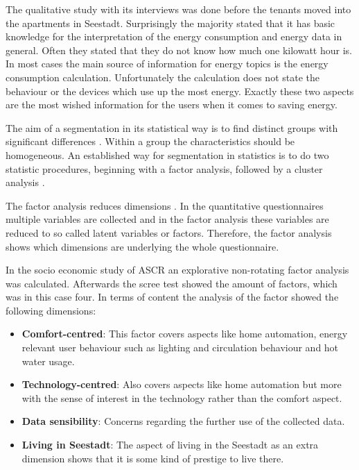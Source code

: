 The qualitative study with its interviews was done before the tenants moved into the apartments in Seestadt. Surprisingly the majority stated that it has basic knowledge for the interpretation of the energy consumption and energy data in general. Often they stated that they do not know how much one kilowatt hour is. In most cases the main source of information for energy topics is the energy consumption calculation. Unfortunately the calculation does not state the behaviour or the devices which use up the most energy. Exactly these two aspects are the most wished information for the users when it comes to saving energy.

The aim of a segmentation in its statistical way is to find distinct groups with significant differences \cite{punj1983cluster}. Within a group the characteristics should be homogeneous. An established way for segmentation in statistics is to do two statistic procedures, beginning with a factor analysis, followed by a cluster analysis \cite{tuffery2011data}.

The factor analysis reduces dimensions \cite{williams2010exploratory}. In the quantitative questionnaires multiple variables are collected and in the factor analysis these variables are reduced to so called latent variables or factors. Therefore, the factor analysis shows which dimensions are underlying the whole questionnaire.

In the socio economic study of ASCR an explorative non-rotating factor analysis was calculated. Afterwards the scree test showed the amount of factors, which was in this case four. In terms of content the analysis of the factor showed the following dimensions:

\begin{itemize}
	\item \textbf{Comfort-centred}: This factor covers aspects like home automation, energy relevant user behaviour such as lighting and circulation behaviour and hot water usage. 
	\item \textbf{Technology-centred}: Also covers aspects like home automation but more with the sense of interest in the technology rather than the comfort aspect.
	\item \textbf{Data sensibility}: Concerns regarding the further use of the collected data.
	\item \textbf{Living in Seestadt}: The aspect of living in the Seestadt as an extra dimension shows that it is some kind of prestige to live there.
\end{itemize}

